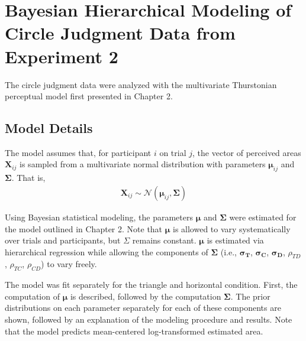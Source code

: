 
\chapter{Bayesian Hierarchical Modeling of Circle Judgment Data from Experiment 2}

The circle judgment data were analyzed with the multivariate Thurstonian perceptual model first presented in Chapter 2. 

\section{Model Details}

The model assumes that, for participant $i$ on trial $j$, the vector of perceived areas $\boldsymbol{X}_{ij}$ is sampled from a multivariate normal distribution with parameters $\boldsymbol{\mu}_{ij}$ and $\boldsymbol{\Sigma}$. That is,
\begin{align}
    \boldsymbol{X}_{ij} \sim \mathcal{N}(\boldsymbol{\mu}_{ij}, \boldsymbol{\Sigma})
\end{align}

Using Bayesian statistical modeling, the parameters $\boldsymbol{\mu}$ and $\boldsymbol{\Sigma}$ were estimated for the model outlined in Chapter 2. Note that $\boldsymbol{\mu}$ is allowed to vary systematically over trials and participants, but $\Sigma$ remains constant. $\boldsymbol{\mu}$ is estimated via hierarchical regression while allowing the components of $\boldsymbol{\Sigma}$ (i.e., $\boldsymbol{\sigma_{T}}$, $\boldsymbol{\sigma_{C}}$, $\boldsymbol{\sigma_{D}}$, $\rho_{TD}$, $\rho_{TC}$, $\rho_{CD}$) to vary freely. 

The model was fit separately for the triangle and horizontal condition. First, the computation of $\boldsymbol{\mu}$ is described, followed by the computation $\boldsymbol{\Sigma}$. The prior distributions on each parameter separately for each of these components are shown, followed by an explanation of the modeling procedure and results. Note that the model predicts mean-centered log-transformed estimated area.

